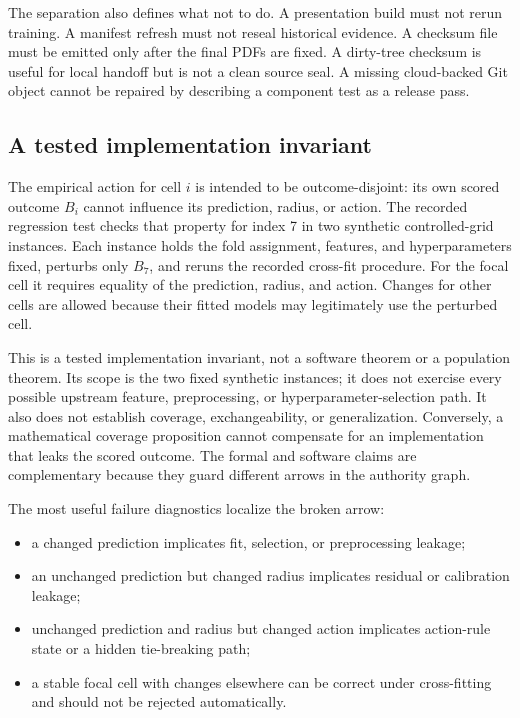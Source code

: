 The separation also defines what not to do.  A presentation build must not rerun training.  A
manifest refresh must not reseal historical evidence.  A checksum file must be emitted only after
the final PDFs are fixed.  A dirty-tree checksum is useful for local handoff but is not a clean
source seal.  A missing cloud-backed Git object cannot be repaired by describing a component test
as a release pass.

\subsection{A tested implementation invariant}
\label{fr:software-invariance}

The empirical action for cell $i$ is intended to be outcome-disjoint: its own scored outcome
$B_i$ cannot influence its prediction, radius, or action.  The recorded regression test checks
that property for index 7 in two synthetic controlled-grid instances.  Each instance holds the
fold assignment, features, and hyperparameters fixed, perturbs only $B_7$, and reruns the recorded
cross-fit procedure.  For the focal cell it requires equality of the prediction, radius, and
action.  Changes for other cells are allowed because their fitted models may legitimately use the
perturbed cell.

This is a tested implementation invariant, not a software theorem or a population theorem.  Its
scope is the two fixed synthetic instances; it does not exercise every possible upstream feature,
preprocessing, or hyperparameter-selection path.  It also does not establish coverage,
exchangeability, or generalization.  Conversely, a mathematical coverage proposition cannot
compensate for an implementation that leaks the scored outcome.  The formal and software claims
are complementary because they guard different arrows in the authority graph.

The most useful failure diagnostics localize the broken arrow:

\begin{itemize}[leftmargin=*]
\item a changed prediction implicates fit, selection, or preprocessing leakage;
\item an unchanged prediction but changed radius implicates residual or calibration leakage;
\item unchanged prediction and radius but changed action implicates action-rule state or a hidden
tie-breaking path;
\item a stable focal cell with changes elsewhere can be correct under cross-fitting and should not
be rejected automatically.
\end{itemize}

